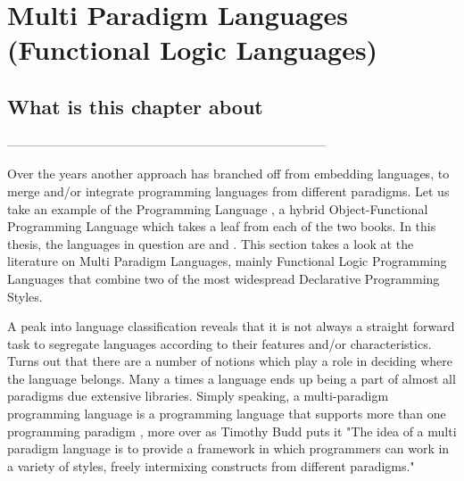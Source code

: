 \documentclass[thesis-solanki.tex]{subfiles}
\begin{document}
\chapter{Multi Paradigm Languages (Functional Logic Languages)}\label{chap:multiparadigm}


\section{What is this chapter about}

-----------------------------------------------------------------------------


Over the years another approach has branched off from embedding languages, to merge and/or integrate programming 
languages from different paradigms. Let us take an example of the  Programming Language \cite{website:scala}, a 
hybrid Object-Functional Programming Language which takes a leaf from each of the two books. In this thesis, the languages in 
question are  and . This section takes a look at the literature on Multi Paradigm Languages, mainly Functional 
Logic Programming Languages that combine two of the most widespread Declarative Programming Styles.

A peak into language classification reveals that it is not always a straight forward task to segregate languages
according to their features and/or characteristics.
Turns out that there are a number of notions which play a role in deciding where the language belongs.
Many a times a language ends up being a part of almost all paradigms due extensive libraries.
Simply speaking, a multi-paradigm programming language is a programming language that supports more than one
programming paradigm \cite{Krishnamurthi:2008:TPL:1480828.1480846}, more over as Timothy Budd puts it
\cite{website:wikimultiparadigm} "The idea of a multi paradigm language is to provide a framework in which
programmers can work in a variety of styles, freely intermixing constructs from different paradigms."



\begin{comment}
\subparagraph{}
In this section we talk about marrying or integrating the paradigms, multi paradigm programming language approach.
Here we talk about combining the two most important and widely spread declarative paradigms, Functional and Logical
Programming Paradigms.
\end{comment}  
\end{document}

